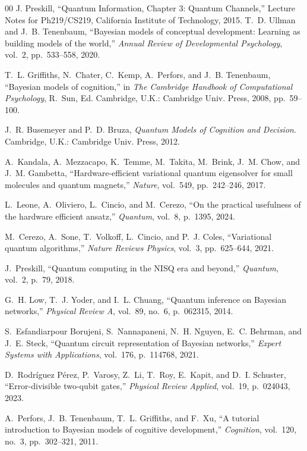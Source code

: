 \documentclass[conference]{IEEEtran}
\begin{document}
\begin{thebibliography}{00}
J. Preskill, 
``Quantum Information, Chapter 3: Quantum Channels,'' 
Lecture Notes for Ph219/CS219, California Institute of Technology, 2015.
T.~D. Ullman and J.~B. Tenenbaum, 
``Bayesian models of conceptual development: Learning as building models of the world,'' 
\textit{Annual Review of Developmental Psychology}, vol.~2, pp.~533--558, 2020.

T.~L. Griffiths, N.~Chater, C.~Kemp, A.~Perfors, and J.~B. Tenenbaum,
``Bayesian models of cognition,'' 
in \textit{The Cambridge Handbook of Computational Psychology}, 
R.~Sun, Ed. Cambridge, U.K.: Cambridge Univ. Press, 2008, pp.~59--100.

J.~R. Busemeyer and P.~D. Bruza, 
\textit{Quantum Models of Cognition and Decision}. 
Cambridge, U.K.: Cambridge Univ. Press, 2012.

A.~Kandala, A.~Mezzacapo, K.~Temme, M.~Takita, M.~Brink, J.~M. Chow, and J.~M. Gambetta, 
``Hardware-efficient variational quantum eigensolver for small molecules and quantum magnets,''
\textit{Nature}, vol.~549, pp.~242--246, 2017.

L.~Leone, A.~Oliviero, L.~Cincio, and M.~Cerezo,
``On the practical usefulness of the hardware efficient ansatz,''
\textit{Quantum}, vol.~8, p.~1395, 2024.

M.~Cerezo, A.~Sone, T.~Volkoff, L.~Cincio, and P.~J. Coles,
``Variational quantum algorithms,'' 
\textit{Nature Reviews Physics}, vol.~3, pp.~625--644, 2021.

J.~Preskill, 
``Quantum computing in the NISQ era and beyond,'' 
\textit{Quantum}, vol.~2, p.~79, 2018.

G.~H. Low, T.~J. Yoder, and I.~L. Chuang, 
``Quantum inference on Bayesian networks,'' 
\textit{Physical Review A}, vol.~89, no.~6, p.~062315, 2014.

S.~Esfandiarpour Borujeni, S.~Nannapaneni, N.~H. Nguyen, E.~C. Behrman, and J.~E. Steck,
``Quantum circuit representation of Bayesian networks,'' 
\textit{Expert Systems with Applications}, vol.~176, p.~114768, 2021.

D.~Rodríguez Pérez, P.~Varosy, Z.~Li, T.~Roy, E.~Kapit, and D.~I. Schuster,
``Error-divisible two-qubit gates,'' 
\textit{Physical Review Applied}, vol.~19, p.~024043, 2023.

A.~Perfors, J.~B. Tenenbaum, T.~L. Griffiths, and F.~Xu,
``A tutorial introduction to Bayesian models of cognitive development,'' 
\textit{Cognition}, vol.~120, no.~3, pp.~302--321, 2011.


\end{thebibliography}
\end{document}
